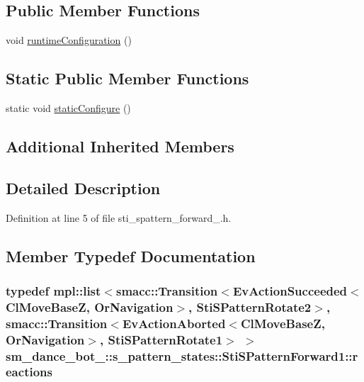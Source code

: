 \subsection*{Public Member Functions}
\begin{DoxyCompactItemize}
\item 
void \hyperlink{structsm__dance__bot__3_1_1s__pattern__states_1_1StiSPatternForward1_a91a733bb092be31302a7ddd06ebc02ed}{runtime\+Configuration} ()
\end{DoxyCompactItemize}
\subsection*{Static Public Member Functions}
\begin{DoxyCompactItemize}
\item 
static void \hyperlink{structsm__dance__bot__3_1_1s__pattern__states_1_1StiSPatternForward1_a637c8492fb227d9d7d49fb2a3281aa28}{static\+Configure} ()
\end{DoxyCompactItemize}
\subsection*{Additional Inherited Members}


\subsection{Detailed Description}


Definition at line 5 of file sti\+\_\+spattern\+\_\+forward\+\_.\+h.



\subsection{Member Typedef Documentation}
\subsubsection[{\texorpdfstring{reactions}{reactions}}]{\setlength{\rightskip}{0pt plus 5cm}typedef mpl\+::list$<${\bf smacc\+::\+Transition}$<$Ev\+Action\+Succeeded$<${\bf Cl\+Move\+BaseZ}, {\bf Or\+Navigation}$>$, {\bf Sti\+S\+Pattern\+Rotate2}$>$, {\bf smacc\+::\+Transition}$<$Ev\+Action\+Aborted$<${\bf Cl\+Move\+BaseZ}, {\bf Or\+Navigation}$>$, {\bf Sti\+S\+Pattern\+Rotate1}$>$ $>$ {\bf sm\+\_\+dance\+\_\+bot\+\_\+::s\+\_\+pattern\+\_\+states\+::\+Sti\+S\+Pattern\+Forward1\+::reactions}}\hypertarget{structsm__dance__bot__3_1_1s__pattern__states_1_1StiSPatternForward1_af5c520b1489e864cd7a3a803b7357577}{}\label{structsm__dance__bot__3_1_1s__pattern__states_1_1StiSPatternForward1_af5c520b1489e864cd7a3a803b7357577}


